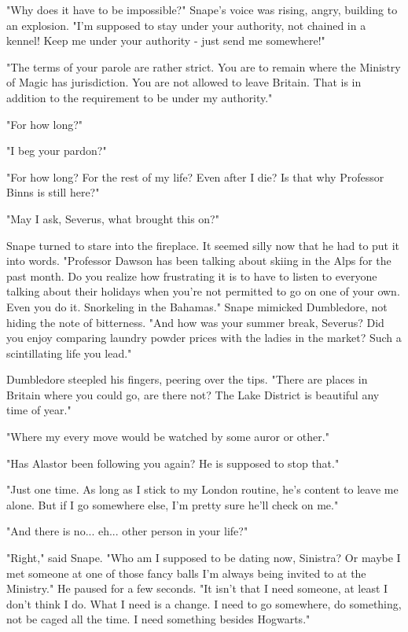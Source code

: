 \documentclass[a4paper,11pt]{article}
\begin{document}
"Why does it have to be impossible?" Snape's voice was rising, angry, building to an explosion. "I'm supposed to stay under your authority, not chained in a kennel! Keep me under your authority - just send me somewhere!"

"The terms of your parole are rather strict. You are to remain where the Ministry of Magic has jurisdiction. You are not allowed to leave Britain. That is in addition to the requirement to be under my authority."

"For how long?"

"I beg your pardon?"

"For how long? For the rest of my life? Even after I die? Is that why Professor Binns is still here?"

"May I ask, Severus, what brought this on?"

Snape turned to stare into the fireplace. It seemed silly now that he had to put it into words. "Professor Dawson has been talking about skiing in the Alps for the past month. Do you realize how frustrating it is to have to listen to everyone talking about their holidays when you're not permitted to go on one of your own. Even you do it. Snorkeling in the Bahamas." Snape mimicked Dumbledore, not hiding the note of bitterness. "And how was your summer break, Severus? Did you enjoy comparing laundry powder prices with the ladies in the market? Such a scintillating life you lead."

Dumbledore steepled his fingers, peering over the tips. "There are places in Britain where you could go, are there not? The Lake District is beautiful any time of year."

"Where my every move would be watched by some auror or other."

"Has Alastor been following you again? He is supposed to stop that."

"Just one time. As long as I stick to my London routine, he's content to leave me alone. But if I go somewhere else, I'm pretty sure he'll check on me."

"And there is no... eh... other person in your life?"

"Right," said Snape. "Who am I supposed to be dating now, Sinistra? Or maybe I met someone at one of those fancy balls I'm always being invited to at the Ministry." He paused for a few seconds. "It isn't that I need someone, at least I don't think I do. What I need is a change. I need to go somewhere, do something, not be caged all the time. I need something besides Hogwarts."
\end{document}
